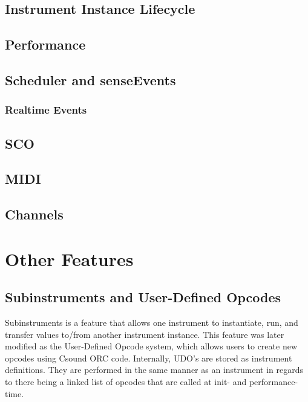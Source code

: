 \documentclass[]{book}
\begin{document}
\section{Instrument Instance Lifecycle}

\section{Performance}

\section{Scheduler and senseEvents}

\subsection{Realtime Events}

\section{SCO}

\section{MIDI}

\section{Channels}


\chapter{Other Features}

\section{Subinstruments and User-Defined Opcodes}

Subinstruments is a feature that allows one instrument to instantiate, run, and transfer values to/from another instrument instance. This feature was later modified as the User-Defined Opcode system, which allows users to create new opcodes using Csound ORC code. Internally, UDO's are stored as instrument definitions. They are performed in the same manner as an instrument in regards to there being a linked list of opcodes that are called at init- and performance-time.  
\end{document}
